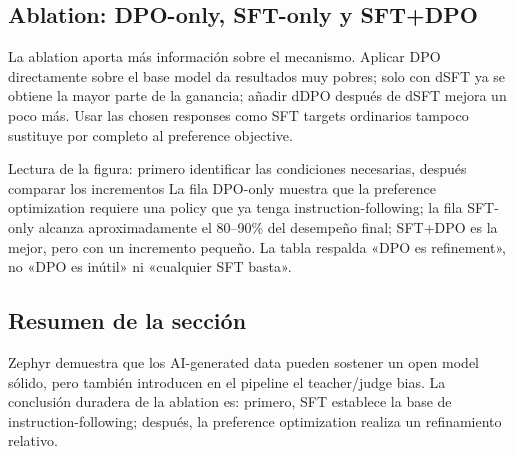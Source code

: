 \subsection{Ablation: DPO-only, SFT-only y SFT+DPO}

La ablation aporta más información sobre el mecanismo. Aplicar DPO directamente sobre el base model da resultados muy pobres; solo con dSFT ya se obtiene la mayor parte de la ganancia; añadir dDPO después de dSFT mejora un poco más. Usar las chosen responses como SFT targets ordinarios tampoco sustituye por completo al preference objective.


\begin{knowledgebox}{Lectura de la figura: primero identificar las condiciones necesarias, después comparar los incrementos}
La fila DPO-only muestra que la preference optimization requiere una policy que ya tenga instruction-following; la fila SFT-only alcanza aproximadamente el 80--90\% del desempeño final; SFT+DPO es la mejor, pero con un incremento pequeño. La tabla respalda «DPO es refinement», no «DPO es inútil» ni «cualquier SFT basta».
\end{knowledgebox}


\subsection{Resumen de la sección}

Zephyr demuestra que los AI-generated data pueden sostener un open model sólido, pero también introducen en el pipeline el teacher/judge bias. La conclusión duradera de la ablation es: primero, SFT establece la base de instruction-following; después, la preference optimization realiza un refinamiento relativo.
